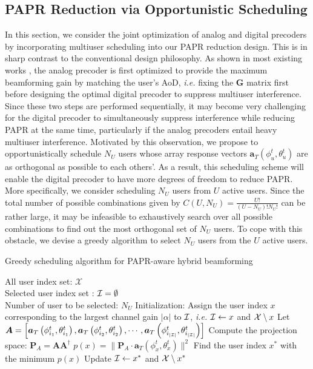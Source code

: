 \documentclass[conference]{IEEEtran}
\begin{document}
\subsection{PAPR Reduction via Opportunistic Scheduling}
In this section, we consider the joint optimization of analog and digital precoders by incorporating multiuser scheduling into our PAPR reduction design. This is in sharp contrast to the conventional design philosophy. As shown in most existing works \cite{alkhateeb2015limited}, the analog precoder is first optimized to provide the maximum beamforming gain by matching the user's AoD, {\em i.e.} fixing the ${\bm G}$ matrix first before designing the optimal digital precoder to suppress multiuser interference. Since these two steps are performed sequentially, it may become very challenging for the digital precoder to simultaneously suppress interference while reducing PAPR at the same time, particularly if the analog precoders entail heavy multiuser interference. Motivated by this observation, we propose to opportunistically schedule $N_U$ users whose array response vectors $\bm{a}_{T}(\phi^t_u,\theta^t_u)$ are as orthogonal as possible to each others'. As a result, this scheduling scheme will enable the digital precoder to have more degrees of freedom to reduce PAPR. More specifically, we consider scheduling $N_U$ users from $U$ active users. Since the total number of possible combinations given by $C\left(U, N_U\right)=\frac{U!}{(U-N_U)!N_U!}$ can be rather large, it may be infeasible to exhaustively search over all possible combinations to find out the most orthogonal set of $N_U$ users. To cope with this obstacle, we devise a greedy algorithm to select $N_U$ users from the $U$ active users.

\begin{algorithm}[h] 		
	\caption{Greedy scheduling algorithm for PAPR-aware hybrid beamforming}
	\label{selection}
	\begin{algorithmic}
		\REQUIRE  \quad
		\STATE	All user index set: $\mathcal{X}$\\
		\STATE  Selected user index set : $\cal{I}=\emptyset$\\
		\STATE  Number of user to be selected: $N_U$
		\ENSURE   	
		\STATE Initialization: Assign the user index $x$ corresponding to the largest channel gain $|\alpha|$ to ${\cal I}$, {\em i.e.} ${\cal I} \leftarrow  x$ and ${\cal X}\setminus x$	
        \STATE Let ${\bm A}=\left[\bm{a}_{T}\left(\phi^t_{i_1},\theta^t_{i_1}\right),\bm{a}_{T}\left(\phi^t_{i_2},\theta^t_{i_2}\right),\cdots,\bm{a}_{T}\left(\phi^t_{i_{|{\cal I}|}},\theta^t_{i_{|{\cal I}|}}\right)\right]$
        \STATE Compute the projection space: ${\bm P}_A = {\bm A}{\bm A}^{\dagger}$ 		 				
		\STATE $p(x) = \|{\bm P}_A\cdot {\bm a}_T\left(\phi^t_{x},\theta^t_{x}\right)\|^2$ 				 								
		\ENDFOR
		\STATE  Find the user index $x^*$ with the minimum $p(x)$ 									
		\STATE	Update ${\cal I} \leftarrow  x^*$ and ${\cal X}\setminus x^*$	
		\ENDWHILE	
	\end{algorithmic}
\end{algorithm}
\end{document}

